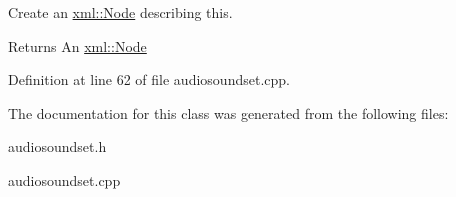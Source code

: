Create an \hyperlink{classMezzanine_1_1xml_1_1Node}{xml::Node} describing this. 

\begin{DoxyReturn}{Returns}
An \hyperlink{classMezzanine_1_1xml_1_1Node}{xml::Node} 
\end{DoxyReturn}


Definition at line 62 of file audiosoundset.cpp.



The documentation for this class was generated from the following files:\begin{DoxyCompactItemize}
\item 
audiosoundset.h\item 
audiosoundset.cpp\end{DoxyCompactItemize}
